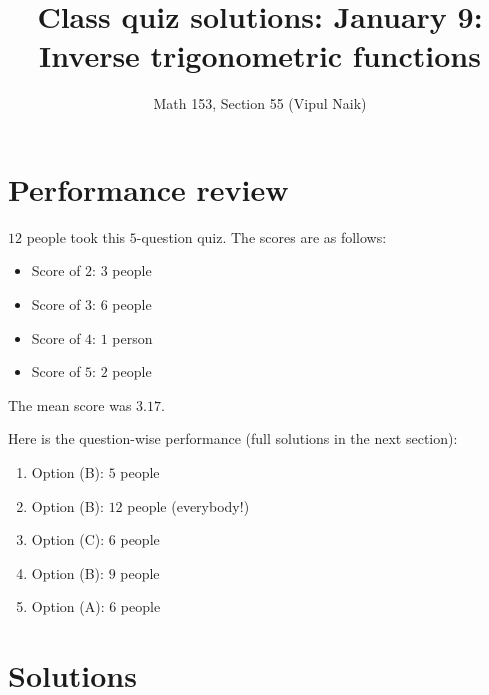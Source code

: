 \documentclass[10pt]{amsart}
\title{Class quiz solutions: January 9: Inverse trigonometric functions}
\author{Math 153, Section 55 (Vipul Naik)}
\begin{document}
\maketitle

\section{Performance review}

$12$ people took this $5$-question quiz. The scores are as follows:

\begin{itemize}
\item Score of $2$: $3$ people
\item Score of $3$: $6$ people
\item Score of $4$: $1$ person
\item Score of $5$: $2$ people
\end{itemize}

The mean score was $3.17$.

Here is the question-wise performance (full solutions in the next
section):

\begin{enumerate}
\item Option (B): $5$ people
\item Option (B): $12$ people (everybody!)
\item Option (C): $6$ people
\item Option (B): $9$ people
\item Option (A): $6$ people
\end{enumerate}

\section{Solutions}
\end{document}
